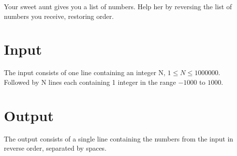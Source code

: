 
Your sweet aunt gives you a list of numbers.
Help her by reversing the list of numbers you receive, restoring order.

\section*{Input}

The input consists of one line containing an integer N, $1 \leq N \leq 1000000$.
Followed by N lines each containing 1 integer in the range $-1000$ to $1000$.

\section*{Output}

The output consists of a single line containing the numbers from the input in reverse order, separated by spaces.
